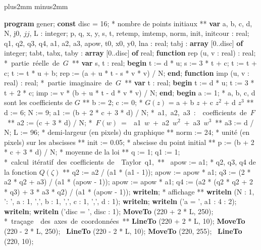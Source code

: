 \vskip7mm plus2mm minus2mm

\def\q{\hskip5mm}
\def\qq{\hskip14mm}

{\obeylines

{\bf program} gener;
\medskip
 {\bf const}  disc = 16; \q {\eightpoint ** nombre de points initiaux **}
\medskip
 {\bf var}
  a, b, c, d, N, j0, $jj$, L : integer;
  p, q, x, y, s, t, retemp, imtemp, norm, init, initcour : real;
  q1, q2, q3, q4, a1, a2, a3, apow, t0, x0, y0, lna : real;
  tabj : {\bf array} [0..disc] {\bf of} integer;
  tabt, tabx, taby : {\bf array} [0..disc] {\bf of} real;
\bigskip
 {\bf function} rep (u, v : real) : real;  \q \hbox{\eightpoint ** partie\  
r\'eelle de $G$ **}
  {\bf var}
   s, t : real;
 {\bf begin}
  t := d * u;
  s := 3 * t + c;
  t := t + c;
  t := t * u + b;
  rep := (a + u * t - s * v * v) / N;
 {\bf end};
 \bigskip
 {\bf function} imp (u, v : real) : real;  \q \hbox{\eightpoint ** partie\  
imaginaire de $G$ **}
  {\bf var}
   t : real;
 {\bf begin}
  t := d * u;
  t := 3 * t + 2 * c;
  imp := v * (b + u * t - d * v * v) / N;
 {\bf end};
\bigskip
{\bf begin}
 a := 1;  \q {\eightpoint ** a, b, c, d sont les coefficients de $G$ **}
 b := 2;
 c := 0;  \q {\eightpoint ** $G(z)$ = a + b $z$ + c $z^2$ + d $z^3$ **} 
 d := 6;
 N := 9;
 a1 := (b + 2 * c + 3 * d) / N; \q \hbox{\eightpoint ** a1, a2, a3 : \ 
 coefficients de  $F$ **} 
 a2 := (c + 3 * d) / N;  \qq \hbox{\eightpoint ** $F(w)$ = \ 
a1 $w$ + a2 $w^2$  + a3 $w^3$ **} 
 a3 := d / N;
 L := 96; \q {\eightpoint ** demi-largeur (en pixels) du graphique **}
 norm := 24; \q {\eightpoint ** unit\'e (en pixels) sur les abscisses **}
 init := 0.05; \q {\eightpoint ** abscisse du point initial **}
 p := (b + 2 * c + 3 * d) / N;  \q {\eightpoint** moyenne de la loi **}
 q := 1;
\medskip
 q1 := 1; \q \hbox{\eightpoint ** calcul it\'eratif des coefficients de \ 
Taylor q1, ** }
 apow := a1; \q {\eightpoint ** q2, q3, q4 de la fonction $Q(\zeta )$ **}
 q2 := a2 / (a1 * (a1 - 1));
 apow := apow * a1;
 q3 := (2 * a2 * q2 + a3) / (a1 * (apow - 1));
 apow := apow * a1;
 q4 := (a2 * (q2 * q2 + 2 * q3) + 3 * a3 * q2) / (a1 * (apow - 1));
\medskip
 {\bf writeln}; \q {\eightpoint ** affichage **}
 {\bf writeln} (N : 1, ': ', a : 1, ',', b : 1, ',', c : 1, ',', d : 1);
 {\bf writeln};
 {\bf writeln} ('a = ', a1 : 4 : 2);
 {\bf writeln};
 {\bf writeln} ('disc = ', disc : 1);
\medskip
 {\bf MoveTo} (220 + 2 * L, 250);  \q \hbox{\eightpoint ** tra\c{c}age \ 
des axes de coordonn\'ees **}
 {\bf LineTo} (220 + 2 * L, 10);
 {\bf MoveTo} (220 - 2 * L, 250); \  {\bf LineTo} (220 - 2 * L, 10);
 {\bf MoveTo} (220, 255); \  {\bf LineTo} (220, 10);
}

